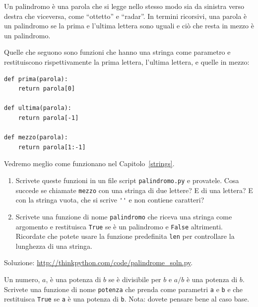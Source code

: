 \documentclass[10pt]{book}
\begin{document}
\vspace{0.2in}
\begin{exercise}
\label{palindrome}

Un palindromo è una parola che si legge nello stesso modo sia da sinistra verso destra che viceversa, come ``ottetto'' e ``radar''. In termini ricorsivi, una parola è un palindromo se la prima e l'ultima lettera sono uguali e ciò che resta in mezzo è un palindromo.

Quelle che seguono sono funzioni che hanno una stringa come parametro e restituiscono rispettivamente la prima lettera, l'ultima lettera, e quelle in mezzo:

\begin{verbatim}
def prima(parola):
    return parola[0]

def ultima(parola):
    return parola[-1]

def mezzo(parola):
    return parola[1:-1]
\end{verbatim}
%
Vedremo meglio come funzionano nel Capitolo~\ref{strings}.

\begin{enumerate}

\item Scrivete queste funzioni in un file script {\tt palindromo.py}
e provatele. Cosa succede se chiamate {\tt mezzo} con una stringa di due lettere?  E di una lettera?  E con la stringa vuota, che si scrive \verb"''" e non contiene caratteri?

\item Scrivete una funzione di nome \verb"palindromo" che riceva una stringa come argomento e restituisca {\tt True} se è un palindromo e {\tt False} altrimenti. Ricordate che potete usare la funzione predefinita {\tt len} per controllare la lunghezza di una stringa.

\end{enumerate}

Soluzione: \url{http://thinkpython.com/code/palindrome_soln.py}.

\end{exercise}

\vspace{0.2in}
\begin{exercise}

Un numero, $a$, è una potenza di $b$ se è divisibile per $b$
e $a/b$ è una potenza di $b$.  Scrivete una funzione di nome
\verb"potenza" che prenda come parametri {\tt a} e {\tt b}
e che restituisca {\tt True} se {\tt a} è una potenza di {\tt b}.
Nota: dovete pensare bene al caso base.

\end{exercise}
\end{document}
